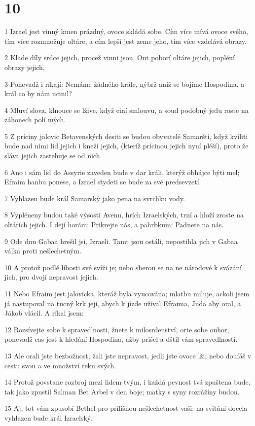 \chapter{10}

\par 1 Izrael jest vinný kmen prázdný, ovoce skládá sobe. Cím více mívá ovoce svého, tím více rozmnožuje oltáre, a cím lepší jest zeme jeho, tím více vzdelává obrazy.
\par 2 Klade díly srdce jejich, procež vinni jsou. Ont poborí oltáre jejich, popléní obrazy jejich,
\par 3 Ponevadž i ríkají: Nemáme žádného krále, nýbrž aniž se bojíme Hospodina, a král co by nám ucinil?
\par 4 Mluví slova, klnouce se lžive, když ciní smlouvu, a soud podobný jedu roste na záhonech polí mých.
\par 5 Z príciny jalovic Betavenských desiti se budou obyvatelé Samarští, když kvíliti bude nad nimi lid jejich i kneží jejich, (kteríž prícinou jejich nyní pléší), proto že sláva jejich zastehuje se od nich.
\par 6 Ano i sám lid do Assyrie zaveden bude v dar králi, kterýž obhájce býti mel; Efraim hanbu ponese, a Izrael stydeti se bude za své predsevzetí.
\par 7 Vyhlazen bude král Samarský jako pena na svrchku vody.
\par 8 Vypléneny budou také výsosti Avenu, hrích Izraelských, trní a hloží zroste na oltárích jejich. I dejí horám: Prikrejte nás, a pahrbkum: Padnete na nás.
\par 9 Ode dnu Gabaa hrešil jsi, Izraeli. Tamt jsou ostáli, nepostihla jich v Gabaa válka proti nešlechetným.
\par 10 A protož podlé líbosti své svíži je; nebo sberou se na ne národové k svázání jich, pro dvojí nepravost jejich.
\par 11 Nebo Efraim jest jalovicka, kteráž byla vyucována; mlatbu miluje, ackoli jsem já nastupoval na tucný krk její, abych k jízde užíval Efraima, Juda aby oral, a Jákob vlácil. A ríkal jsem:
\par 12 Rozsívejte sobe k spravedlnosti, žnete k milosrdenství, orte sobe ouhor, ponevadž cas jest k hledání Hospodina, ažby prišel a dštil vám spravedlností.
\par 13 Ale orali jste bezbožnost, žali jste nepravost, jedli jste ovoce lži; nebo doufáš v cestu svou a ve množství reku svých.
\par 14 Protož povstane rozbroj mezi lidem tvým, i každá pevnost tvá zpuštena bude, tak jako zpustil Salman Bet Arbel v den boje; matky s syny rozrážíny budou.
\par 15 Aj, tot vám zpusobí Bethel pro prílišnou nešlechetnost vaši; na svitání docela vyhlazen bude král Izraelský.


